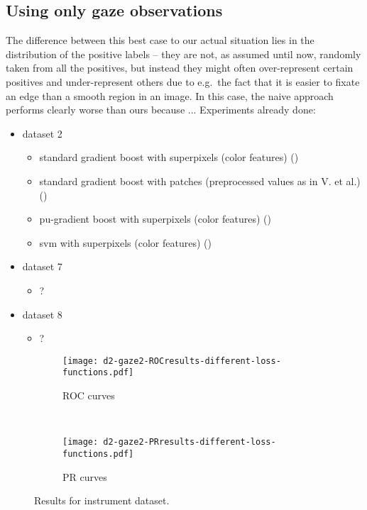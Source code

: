 \subsection{Using only gaze observations}
The difference between this best case to our actual situation lies in the distribution of the positive labels -- they are not, as assumed until now, randomly taken from all the positives, but instead they might often over-represent certain positives and under-represent others due to e.g.\ the fact that it is easier to fixate an edge than a smooth region in an image. 
In this case, the naive approach performs clearly worse than ours because ...  Experiments already done:
\begin{itemize}
\item dataset 2
  \begin{itemize}
  \item standard gradient boost with superpixels (color features) ()
  \item standard gradient boost with patches (preprocessed values as in V. et al.) ()
  \item pu-gradient boost with superpixels (color features) ()
  \item svm with superpixels (color features) ()
  \end{itemize}
\item dataset 7
  \begin{itemize}
  \item ?
  \end{itemize}
\item dataset 8
  \begin{itemize}
  \item ?
  \end{itemize}


\end{itemize}


\begin{figure}[ht]
	\centering
	\begin{subfigure}[h]{0.45\textwidth}
	\texttt{[image: d2-gaze2-ROCresults-different-loss-functions.pdf]}	
		\caption*{ROC curves}
	\end{subfigure}
	~
	\begin{subfigure}[h]{0.45\textwidth}
	\texttt{[image: d2-gaze2-PRresults-different-loss-functions.pdf]}	
		\caption*{PR curves}
	\end{subfigure}
	\caption{Results for instrument dataset.}
	\label{fig:d2-results-curves}
\end{figure}

